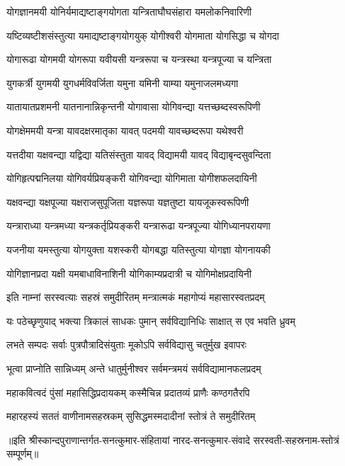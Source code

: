 \twolineshloka
{योगज्ञानमयी योनिर्यमाद्यष्टाङ्गयोगता}
{यन्त्रिताघौघसंहारा यमलोकनिवारिणी}%

\twolineshloka
{यष्टिव्यष्टीशसंस्तुत्या यमाद्यष्टाङ्गयोगयुक्}
{योगीश्वरी योगमाता योगसिद्धा च योगदा}%

\twolineshloka
{योगारूढा योगमयी योगरूपा यवीयसी}
{यन्त्ररूपा च यन्त्रस्था यन्त्रपूज्या च यन्त्रिता}%

\twolineshloka
{युगकर्त्री युगमयी युगधर्मविवर्जिता}
{यमुना यमिनी याम्या यमुनाजलमध्यगा}%

\twolineshloka
{यातायातप्रशमनी यातनानान्निकृन्तनी}
{योगावासा योगिवन्द्या यत्तच्छब्दस्वरूपिणी}%

\twolineshloka
{योगक्षेममयी यन्त्रा यावदक्षरमातृका}
{यावत् पदमयी यावच्छब्दरूपा यथेश्वरी}%

\twolineshloka
{यत्तदीया यक्षवन्द्या यद्विद्या यतिसंस्तुता}
{यावद् विद्यामयी यावद् विद्याबृन्दसुवन्दिता}%

\twolineshloka
{योगिहृत्पद्मनिलया योगिवर्यप्रियङ्करी}
{योगिवन्द्या योगिमाता योगीशफलदायिनी}%

\twolineshloka
{यक्षवन्द्या यक्षपूज्या यक्षराजसुपूजिता}
{यज्ञरूपा यज्ञतुष्टा यायजूकस्वरूपिणी}%

\twolineshloka
{यन्त्राराध्या यन्त्रमध्या यन्त्रकर्तृप्रियङ्करी}
{यन्त्रारूढा यन्त्रपूज्या योगिध्यानपरायणा}%

\twolineshloka
{यजनीया यमस्तुत्या योगयुक्ता यशस्करी}
{योगबद्धा यतिस्तुत्या योगज्ञा योगनायकी}%

\twolineshloka
{योगिज्ञानप्रदा यक्षी यमबाधाविनाशिनी}
{योगिकाम्यप्रदात्री च योगिमोक्षप्रदायिनी}%


 \resetShloka

\twolineshloka
{इति नाम्नां सरस्वत्याः सहस्रं समुदीरितम्}
{मन्त्रात्मकं महागोप्यं महासारस्वतप्रदम्}%

\twolineshloka
{यः पठेच्छृणुयाद् भक्त्या त्रिकालं साधकः पुमान्}
{सर्वविद्यानिधिः साक्षात् स एव भवति ध्रुवम्}%

\twolineshloka
{लभते सम्पदः सर्वाः पुत्रपौत्रादिसंयुताः}
{मूकोऽपि सर्वविद्यासु चतुर्मुख इवापरः}%

\twolineshloka
{भूत्वा प्राप्नोति सान्निध्यम् अन्ते धातुर्मुनीश्वर}
{सर्वमन्त्रमयं सर्वविद्यामानफलप्रदम्}%

\twolineshloka
{महाकवित्वदं पुंसां महासिद्धिप्रदायकम्}
{कस्मैचिन्न प्रदातव्यं प्राणैः कण्ठगतैरपि}%

\twolineshloka
{महारहस्यं सततं वाणीनामसहस्रकम्}
{सुसिद्धमस्मदादीनां स्तोत्रं ते समुदीरितम्}%


॥इति श्रीस्कान्दपुराणान्तर्गत-सनत्कुमार-संहितायां नारद-सनत्कुमार-संवादे सरस्वती-सहस्रनाम-स्तोत्रं सम्पूर्णम्॥
